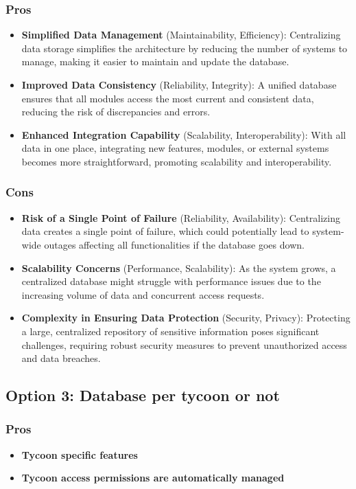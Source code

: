 \subsubsection*{Pros}
\begin{itemize}[noitemsep]
    \item \textbf{Simplified Data Management} (Maintainability, Efficiency): Centralizing data storage simplifies the architecture by reducing the number of systems to manage, making it easier to maintain and update the database.
    \item \textbf{Improved Data Consistency} (Reliability, Integrity): A unified database ensures that all modules access the most current and consistent data, reducing the risk of discrepancies and errors.
    \item \textbf{Enhanced Integration Capability} (Scalability, Interoperability): With all data in one place, integrating new features, modules, or external systems becomes more straightforward, promoting scalability and interoperability.
\end{itemize}

\subsubsection*{Cons}
\begin{itemize}[noitemsep]
    \item \textbf{Risk of a Single Point of Failure} (Reliability, Availability): Centralizing data creates a single point of failure, which could potentially lead to system-wide outages affecting all functionalities if the database goes down.
    \item \textbf{Scalability Concerns} (Performance, Scalability): As the system grows, a centralized database might struggle with performance issues due to the increasing volume of data and concurrent access requests.
    \item \textbf{Complexity in Ensuring Data Protection} (Security, Privacy): Protecting a large, centralized repository of sensitive information poses significant challenges, requiring robust security measures to prevent unauthorized access and data breaches.
\end{itemize}

\subsection*{Option 3: Database per tycoon or not}

\subsubsection*{Pros}
\begin{itemize}[noitemsep]
    \item \textbf{Tycoon specific features} 
    \item \textbf{Tycoon access permissions are automatically managed} 
\end{itemize}

